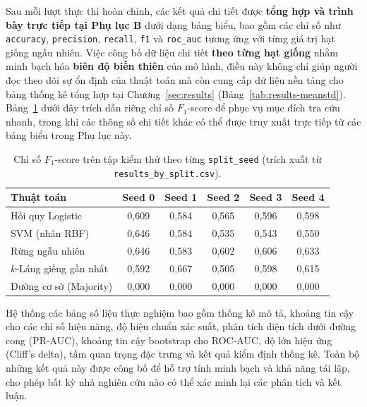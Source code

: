 \documentclass[14pt,a4paper]{extreport}
\begin{document}
Sau mỗi lượt thực thi hoàn chỉnh, các kết quả chi tiết được \textbf{tổng hợp và trình bày trực tiếp tại Phụ lục B} dưới dạng bảng biểu, bao gồm các chỉ số như \texttt{accuracy}, \texttt{precision}, \texttt{recall}, \texttt{f1} và \texttt{roc\_auc} tương ứng với từng giá trị hạt giống ngẫu nhiên. Việc công bố dữ liệu chi tiết \textbf{theo từng hạt giống} nhằm minh bạch hóa \textbf{biên độ biến thiên} của mô hình, điều này không chỉ giúp người đọc theo dõi sự ổn định của thuật toán mà còn cung cấp dữ liệu nền tảng cho bảng thống kê tổng hợp tại Chương~\ref{sec:results} (Bảng~\ref{tab:results-meanstd}). Bảng~\ref{tab:appendix-f1-by-split} dưới đây trích dẫn riêng chỉ số $F_1$-score để phục vụ mục đích tra cứu nhanh, trong khi các thông số chi tiết khác có thể được truy xuất trực tiếp từ các bảng biểu trong Phụ lục này.

\begin{table}[htbp]
  \centering
  \small
  \setlength{\tabcolsep}{6pt}
  \caption{Chỉ số $F_1$-score trên tập kiểm thử theo từng \texttt{split\_seed} (trích xuất từ \texttt{results\_by\_split.csv}).}
  \label{tab:appendix-f1-by-split}
  \begin{tabular}{lccccc}
    \toprule
    \textbf{Thuật toán} & \textbf{Seed 0} & \textbf{Seed 1} & \textbf{Seed 2} & \textbf{Seed 3} & \textbf{Seed 4} \\
    \midrule
    Hồi quy Logistic      & 0{,}609 & 0{,}584 & 0{,}565 & 0{,}596 & 0{,}598 \\
    SVM (nhân RBF)        & 0{,}646 & 0{,}584 & 0{,}535 & 0{,}543 & 0{,}550 \\
    Rừng ngẫu nhiên       & 0{,}646 & 0{,}583 & 0{,}602 & 0{,}606 & 0{,}633 \\
    $k$-Láng giềng gần nhất & 0{,}592 & 0{,}667 & 0{,}505 & 0{,}598 & 0{,}615 \\
    Đường cơ sở (Majority) & 0{,}000 & 0{,}000 & 0{,}000 & 0{,}000 & 0{,}000 \\
    \bottomrule
  \end{tabular}
\end{table}

\noindent Hệ thống các bảng số liệu thực nghiệm bao gồm thống kê mô tả, khoảng tin cậy cho các chỉ số hiệu năng, độ hiệu chuẩn xác suất, phân tích diện tích dưới đường cong (PR-AUC), khoảng tin cậy bootstrap cho ROC-AUC, độ lớn hiệu ứng (Cliff's delta), tầm quan trọng đặc trưng và kết quả kiểm định thống kê. Toàn bộ những kết quả này được công bố để hỗ trợ tính minh bạch và khả năng tái lập, cho phép bất kỳ nhà nghiên cứu nào có thể xác minh lại các phân tích và kết luận.
\end{document}
